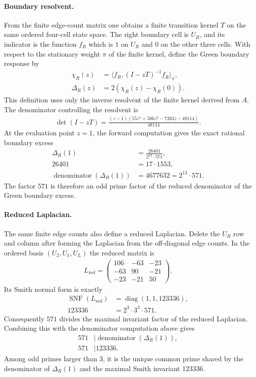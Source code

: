 \paragraph{Boundary resolvent.}
From the finite edge-count matrix one obtains a finite transition kernel $T$ on the same ordered four-cell state space. The right boundary cell is $U_R$, and its indicator is the function $f_R$ which is $1$ on $U_R$ and $0$ on the other three cells. With respect to the stationary weight $\pi$ of the finite kernel, define the Green boundary response by
$$
\begin{aligned}
\chi_R(z)&=\langle f_R,(I-zT)^{-1}f_R\rangle_{\pi},\\
\Delta_R(z)&=2(\chi_R(z)-\chi_R(0)).
\end{aligned}
$$
This definition uses only the inverse resolvent of the finite kernel derived from $A$. The denominator controlling the resolvent is
$$
\begin{aligned}
\det(I-zT)=\frac{(z-1)(55z^3+506z^2-7263z-48114)}{48114}.
\end{aligned}
$$
At the evaluation point $z=1$, the forward computation gives the exact rational boundary excess
$$
\begin{aligned}
\Delta_R(1)&=\frac{26401}{2^{13}\cdot 571},\\
26401&=17\cdot 1553,\\
\operatorname{denominator}(\Delta_R(1))&=4677632=2^{13}\cdot 571.
\end{aligned}
$$
The factor $571$ is therefore an odd prime factor of the reduced denominator of the Green boundary excess.

\paragraph{Reduced Laplacian.}
The same finite edge counts also define a reduced Laplacian. Delete the $U_R$ row and column after forming the Laplacian from the off-diagonal edge counts. In the ordered basis $(U_2,U_1,U_L)$ the reduced matrix is
$$
\begin{aligned}
L_{\mathrm{red}}=
\begin{pmatrix}
106&-63&-23\\
-63&90&-21\\
-23&-21&50
\end{pmatrix}.
\end{aligned}
$$
Its Smith normal form is exactly
$$
\begin{aligned}
\operatorname{SNF}(L_{\mathrm{red}})&=\operatorname{diag}(1,1,123336),\\
123336&=2^3\cdot 3^3\cdot 571.
\end{aligned}
$$
Consequently $571$ divides the maximal invariant factor of the reduced Laplacian. Combining this with the denominator computation above gives
$$
\begin{aligned}
571&\mid \operatorname{denominator}(\Delta_R(1)),\\
571&\mid 123336.
\end{aligned}
$$
Among odd primes larger than $3$, it is the unique common prime shared by the denominator of $\Delta_R(1)$ and the maximal Smith invariant $123336$.

